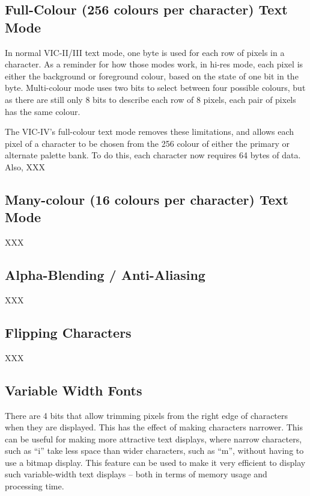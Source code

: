 \subsection{Full-Colour (256 colours per character) Text Mode}

In normal VIC-II/III text mode, one byte is used for each row of pixels in a character.  As a reminder for how those modes work, in
hi-res mode, each pixel is either the background or foreground colour, based on the state of one bit in the byte.  Multi-colour mode
uses two bits to select between four possible colours, but as there are still only 8 bits to describe each row of 8 pixels, each pair
of pixels has the same colour.

The VIC-IV's full-colour text mode removes these limitations, and allows each pixel of a character to be chosen from the 256 colour of
either the primary or alternate palette bank.  To do this, each character now requires 64 bytes of data.  Also,
XXX

\subsection{Many-colour (16 colours per character) Text Mode}

XXX

\subsection{Alpha-Blending / Anti-Aliasing}

XXX

\subsection{Flipping Characters}

XXX

\subsection{Variable Width Fonts}

There are 4 bits that allow trimming pixels from the right edge of characters when they are displayed. This has the effect of making
characters narrower. This can be useful for making more attractive text displays, where narrow characters, such as ``i'' take less space than wider characters, such as ``m'', without having to use a bitmap display. This feature can be used to make it very efficient to display
such variable-width text displays -- both in terms of memory usage and processing time.

